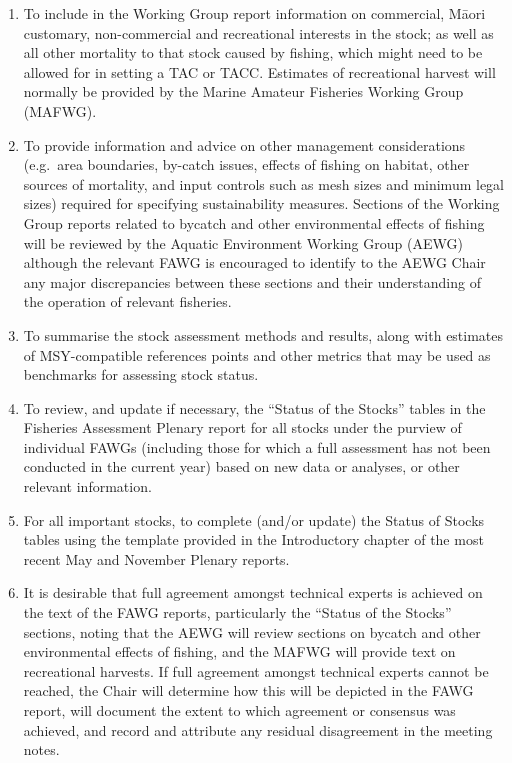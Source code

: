 \documentclass{mpi-plenary}
\newcounter{chapter}
\theoremstyle{definition}
\theoremstyle{definition}
\theoremstyle{definition}
\theoremstyle{remark}
\begin{document}
\begin{enumerate}
\def\labelenumi{\arabic{enumi}.}
\setcounter{enumi}{9}
\item
  To include in the Working Group report information on commercial,
  Māori customary, non-commercial and recreational interests in the
  stock; as well as all other mortality to that stock caused by fishing,
  which might need to be allowed for in setting a TAC or TACC. Estimates
  of recreational harvest will normally be provided by the Marine
  Amateur Fisheries Working Group (MAFWG).
\item
  To provide information and advice on other management considerations
  (e.g.~area boundaries, by-catch issues, effects of fishing on habitat,
  other sources of mortality, and input controls such as mesh sizes and
  minimum legal sizes) required for specifying sustainability measures.
  Sections of the Working Group reports related to bycatch and other
  environmental effects of fishing will be reviewed by the Aquatic
  Environment Working Group (AEWG) although the relevant FAWG is
  encouraged to identify to the AEWG Chair any major discrepancies
  between these sections and their understanding of the operation of
  relevant fisheries.
\item
  To summarise the stock assessment methods and results, along with
  estimates of MSY-compatible references points and other metrics that
  may be used as benchmarks for assessing stock status.
\item
  To review, and update if necessary, the ``Status of the Stocks''
  tables in the Fisheries Assessment Plenary report for all stocks under
  the purview of individual FAWGs (including those for which a full
  assessment has not been conducted in the current year) based on new
  data or analyses, or other relevant information.
\item
  For all important stocks, to complete (and/or update) the Status of
  Stocks tables using the template provided in the Introductory chapter
  of the most recent May and November Plenary reports.
\item
  It is desirable that full agreement amongst technical experts is
  achieved on the text of the FAWG reports, particularly the ``Status of
  the Stocks'' sections, noting that the AEWG will review sections on
  bycatch and other environmental effects of fishing, and the MAFWG will
  provide text on recreational harvests. If full agreement amongst
  technical experts cannot be reached, the Chair will determine how this
  will be depicted in the FAWG report, will document the extent to which
  agreement or consensus was achieved, and record and attribute any
  residual disagreement in the meeting notes.
\end{enumerate}
\end{document}
